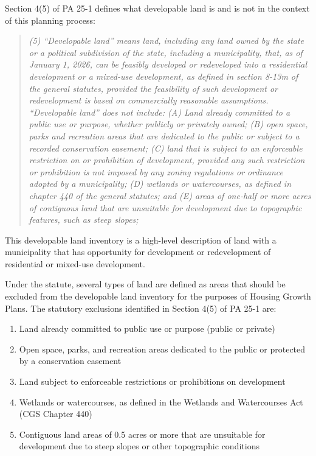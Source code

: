 \documentclass[
  letterpaper,
  DIV=11,
  numbers=noendperiod]{scrreprt}
\providecommand{\tightlist}{%
  \setlength{\itemsep}{0pt}\setlength{\parskip}{0pt}}
\begin{document}
Section 4(5) of PA 25-1 defines what developable land is and is not in
the context of this planning process:

\begin{quote}
\emph{(5) ``Developable land'' means land, including any land owned by
the state or a political subdivision of the state, including a
municipality, that, as of January 1, 2026, can be feasibly developed or
redeveloped into a residential development or a mixed-use development,
as defined in section 8-13m of the general statutes, provided the
feasibility of such development or redevelopment is based on
commercially reasonable assumptions. ``Developable land'' does not
include: (A) Land already committed to a public use or purpose, whether
publicly or privately owned; (B) open space, parks and recreation areas
that are dedicated to the public or subject to a recorded conservation
easement; (C) land that is subject to an enforceable restriction on or
prohibition of development, provided any such restriction or prohibition
is not imposed by any zoning regulations or ordinance adopted by a
municipality; (D) wetlands or watercourses, as defined in chapter 440 of
the general statutes; and (E) areas of one-half or more acres of
contiguous land that are unsuitable for development due to topographic
features, such as steep slopes;}
\end{quote}

This developable land inventory is a high-level description of land with
a municipality that has opportunity for development or redevelopment of
residential or mixed-use development.

Under the statute, several types of land are defined as areas that
should be excluded from the developable land inventory for the purposes
of Housing Growth Plans. The statutory exclusions identified in Section
4(5) of PA 25-1 are:

\begin{enumerate}
\def\labelenumi{\Alph{enumi}.}
\tightlist
\item
  Land already committed to public use or purpose (public or private)
\item
  Open space, parks, and recreation areas dedicated to the public or
  protected by a conservation easement
\item
  Land subject to enforceable restrictions or prohibitions on
  development
\item
  Wetlands or watercourses, as defined in the Wetlands and Watercourses
  Act (CGS Chapter 440)
\item
  Contiguous land areas of 0.5 acres or more that are unsuitable for
  development due to steep slopes or other topographic conditions
\end{enumerate}
\end{document}
